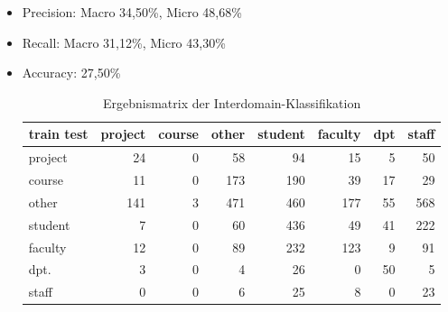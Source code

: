 \begin{frame}[c]
\begin{itemize}
  \item Precision: Macro 34,50\%, Micro 48,68\%
  \item Recall: Macro 31,12\%, Micro 43,30\%
  \item Accuracy: 27,50\%
\begin{table}[htbp]
\begin{tabular}{|l|r|r|r|r|r|r|r|}
\hline
train test & \multicolumn{1}{l|}{project} & \multicolumn{1}{l|}{course} & \multicolumn{1}{l|}{other} & \multicolumn{1}{l|}{student} & \multicolumn{1}{l|}{faculty} & \multicolumn{1}{l|}{dpt} & \multicolumn{1}{l|}{staff} \\ \hline
project & 24 & 0 & 58 & 94 & 15 & 5 & 50 \\ \hline
course & 11 & 0 & 173 & 190 & 39 & 17 & 29 \\ \hline
other & 141 & 3 & 471 & 460 & 177 & 55 & 568 \\ \hline
student & 7 & 0 & 60 & 436 & 49 & 41 & 222 \\ \hline
faculty & 12 & 0 & 89 & 232 & 123 & 9 & 91 \\ \hline
dpt. & 3 & 0 & 4 & 26 & 0 & 50 & 5 \\ \hline
staff & 0 & 0 & 6 & 25 & 8 & 0 & 23 \\ \hline
\end{tabular}
\caption{Ergebnismatrix der Interdomain-Klassifikation}
\label{tbl:InterdomainCls}
\end{table}
\end{itemize}
\end{frame}

